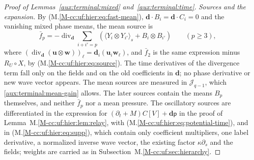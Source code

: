\documentclass[11pt]{amsart}
\numberwithin{equation}{section}
\newcommand{\diver}{\operatorname{div}}
\newcommand{\av}[1]{\langle #1\rangle_s}
\begin{document}
\begin{proof}[Proof of Lemmas~\ref{aux:terminal:mixed} and~\ref{aux:terminal:time}]
\emph{Sources and the expansion.} By \textup{(M.\ref{M-cc:uf:hier:eq:fast-mean})},
$\mathbf d\cdot B_i=\mathbf d\cdot C_i=0$ and the vanishing mixed phase means,
the mean source is
\[
 \bar f_p=-\diver_{\mathbf d}\sum_{i+i'=p}
              (\av{Y_i\otimes Y_{i'}}+B_i\otimes B_{i'})\qquad(p\ge3),
\]
where
$(\diver_{\mathbf d}(\mathbf u\otimes \mathbf w))_\ell=\mathbf d_i(\mathbf u_i\mathbf w_\ell)$,
and $\bar f_2$ is the same expression minus $R_U\circ X$, by
\textup{(M.\ref{M-cc:uf:hier:eq:source})}.
The time derivatives of the divergence term fall only on the fields and
on the old coefficients in $\mathbf d$; no phase derivative or new wave vector
appears. The mean sources are measured in $\mathcal J_{q-1}$, which
\eqref{aux:terminal:mean-gain} allows. The later sources contain
the means $B_p$ themselves, and neither $\bar f_p$ nor a mean pressure.
The oscillatory sources are differentiated in the expression for
$(\partial_t+M)C[V]+\mathbf d\mathsf p$ in the proof of
Lemma~M.\ref{M-cc:uf:hier:lem:relay}, with
\textup{(M.\ref{M-cc:uf:hier:eq:potential-time})}, and in \textup{(M.\ref{M-cc:uf:hier:eq:supp})},
which contain only coefficient multipliers, one label derivative, a
normalized inverse wave vector, the existing factor $\kappa\partial_s$ and
the fields; weights are carried as in
Subsection~M.\ref{M-cc:uf:sec:hierarchy}.


\end{proof}
\end{document}
